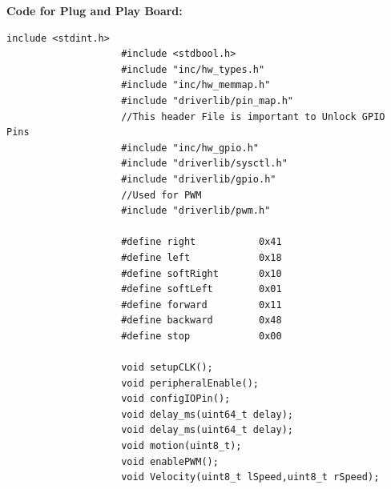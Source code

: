 \documentclass[a4paper,10pt,oneside]{article}
\begin{document}
				\textbf{Code for Plug and Play Board:}
				\begin{lstlisting}[style=CStyle]
					include <stdint.h>
					#include <stdbool.h>
					#include "inc/hw_types.h"
					#include "inc/hw_memmap.h"
					#include "driverlib/pin_map.h"
					//This header File is important to Unlock GPIO Pins
					#include "inc/hw_gpio.h"
					#include "driverlib/sysctl.h"
					#include "driverlib/gpio.h"
					//Used for PWM
					#include "driverlib/pwm.h"
					
					#define right           0x41
					#define left            0x18
					#define softRight       0x10
					#define softLeft        0x01
					#define forward         0x11
					#define backward        0x48
					#define stop            0x00
					
					void setupCLK();
					void peripheralEnable();
					void configIOPin();
					void delay_ms(uint64_t delay);
					void delay_ms(uint64_t delay);
					void motion(uint8_t);
					void enablePWM();
					void Velocity(uint8_t lSpeed,uint8_t rSpeed);
					

\end{lstlisting}
\end{document}
